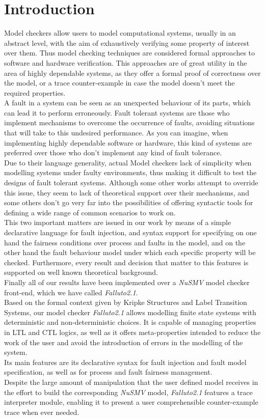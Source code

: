 \documentclass[12pt]{article}
\begin{document}
\section{Introduction}
Model checkers allow users to model computational systems, usually in an
abstract level, with the aim of exhaustively verifying some property of
interest over them. Thus model checking techniques are considered formal
approaches to software and hardware verification. This approaches are of great
utility in the area of highly dependable systems, as they offer a formal proof
of correctness over the model, or a trace counter-example in case the model
doesn't meet the required properties.\\
A fault in a system can be seen as an unexpected behaviour of its parts, which
can lead it to perform erroneously. Fault tolerant systems are those who
implement mechanisms to overcome the occurrence of faults, avoiding situations
that will take to this undesired performance. As you can imagine, when
implementing highly dependable software or hardware, this kind of systems are
preferred over those who don't implement any kind of fault tolerance.\\
Due to their language generality, actual Model checkers lack of simplicity when
modelling systems under faulty environments, thus making it difficult to test
the designs of fault tolerant systems. Although some other works attempt to
override this issue, they seem to lack of theoretical support over their
mechanisms, and some others don't go very far into the possibilities
of offering syntactic tools for defining a wide range of common scenarios to
work on.\\
This two important matters are issued in our work by means of a simple
declarative language for fault injection, and syntax support for specifying
on one hand the fairness conditions over process and faults in the model, and 
on the other hand the fault behaviour model under which each specific property
will be checked. Furthermore, every result and decision that matter to this
features is supported on well known theoretical background.\\
Finally all of our results have been implemented over a
\mbox{\textit{NuSMV}}\cite{nusmv} model checker front-end, which we have called
\mbox{\textit{Falluto2.1}}.\\
Based on the formal context given by Kripke Structures and Label Transition 
Systems, our model checker \mbox{\textit{Falluto2.1}} allows modelling finite
state systems with deterministic and non-deterministic choices. It is capable of managing
properties in LTL and CTL
logics, as well as it offers meta-properties intended to reduce the work of the
user and avoid the introduction of errors in the modelling of the system.\\
Its main features are its declarative syntax for fault injection and fault
model specification, as well as for process and fault fairness management.\\
Despite the large amount of manipulation that the user defined model receives
in the effort to build the corresponding \mbox{\textit{NuSMV}} model,
\mbox{\textit{Falluto2.1}} features a trace interpreter module, enabling it
to present a user comprehensible counter-example trace when ever needed.
\end{document}
